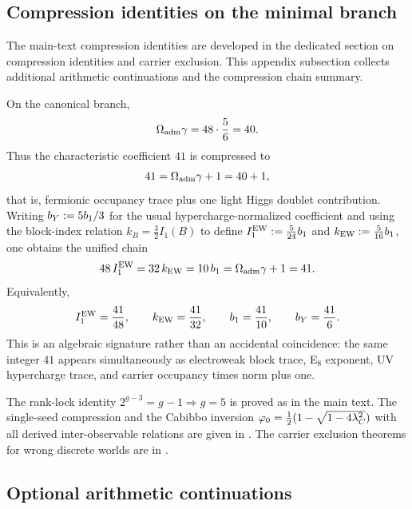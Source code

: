 \subsection{Compression identities on the minimal branch}

The main-text compression identities are developed in the dedicated section on compression identities and carrier exclusion. This appendix subsection collects additional arithmetic continuations and the compression chain summary.

\begin{remark}
On the canonical branch,
\[
\Omega_{\mathrm{adm}}\gamma=48\cdot\frac56=40.
\]
Thus the characteristic coefficient $41$ is compressed to
\[
41=\Omega_{\mathrm{adm}}\gamma+1=40+1,
\]
that is, fermionic occupancy trace plus one light Higgs doublet contribution.
Writing $b_Y:=5b_1/3$ for the usual hypercharge-normalized coefficient and using the block-index relation $k_B=\frac32 I_1(B)$ to define $I_1^{\mathrm{EW}}:=\frac{5}{24}b_1$ and $k_{\mathrm{EW}}:=\frac{5}{16}b_1$, one obtains the unified chain
\begin{equation}
\label{eq:41-chain}
48\,I_1^{\mathrm{EW}}
=32\,k_{\mathrm{EW}}
=10\,b_1
=\Omega_{\mathrm{adm}}\gamma+1
=41.
\end{equation}
Equivalently,
\[
I_1^{\mathrm{EW}}=\frac{41}{48},
\qquad
k_{\mathrm{EW}}=\frac{41}{32},
\qquad
b_1=\frac{41}{10},
\qquad
b_Y=\frac{41}{6}.
\]
This is an algebraic signature rather than an accidental coincidence: the same integer $41$ appears simultaneously as electroweak block trace, E$_8$ exponent, UV hypercharge trace, and carrier occupancy times norm plus one.
\end{remark}

\begin{remark}
The rank-lock identity $2^{g-3}=g-1\Rightarrow g=5$ is proved as  in the main text.
The single-seed compression and the Cabibbo inversion $\varphi_0=\frac12(1-\sqrt{1-4\lambda_C^2})$ with all derived inter-observable relations are given in . The carrier exclusion theorems for wrong discrete worlds are in .
\end{remark}

\subsection{Optional arithmetic continuations}


